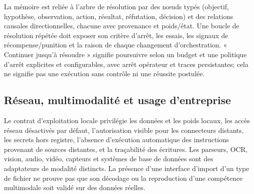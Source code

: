 La mémoire est reliée à l'arbre de résolution par des nœuds typés (objectif, hypothèse, observation, action, résultat, réfutation, décision) et des relations causales directionnelles, chacune avec provenance et poids/état. Une boucle de résolution répétée doit exposer son critère d'arrêt, les essais, les signaux de récompense/punition et la raison de chaque changement d'orchestration. « Continuer jusqu'à résoudre » signifie poursuivre selon un budget et une politique d'arrêt explicites et configurables, avec arrêt opérateur et traces persistantes; cela ne signifie pas une exécution sans contrôle ni une réussite postulée.

\subsection{Réseau, multimodalité et usage d'entreprise}
Le contrat d'exploitation locale privilégie les données et les poids locaux, les accès réseau désactivés par défaut, l'autorisation visible pour les connecteurs distants, les secrets hors registre, l'absence d'exécution automatique des instructions provenant de sources distantes, et la traçabilité des écritures. Les parseurs, OCR, vision, audio, vidéo, capteurs et systèmes de base de données sont des adaptateurs de modalité distincts. La présence d'une interface d'import d'un type de fichier ne prouve pas que son décodage ou la reproduction d'une compétence multimodale soit validé sur des données réelles.

